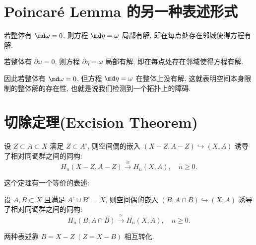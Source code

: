 \section[Poincar\'e Lemma]{Poincar\'e Lemma 的另一种表述形式}
    \begin{lemma}
        若整体有 $\md\omega = 0$, 
        则方程 $\md\eta=\omega$ 局部有解, 
        即在每点处存在邻域使得方程有解.
    \end{lemma}
    \begin{lemma}
        若整体有 $\overline{\partial}\omega = 0$, 
        则方程 $\overline{\partial}\eta=\omega$ 局部有解, 
        即在每点处存在邻域使得方程有解.
    \end{lemma}
    \begin{remark}
        因此若整体有 $\md\omega = 0$, 
        但方程 $\md\eta=\omega$ 在整体上没有解, 
        这就表明空间本身限制的整体解的存在性, 
        也就是说我们检测到一个拓扑上的障碍.
    \end{remark}

\section[Excision Theorem in Signular Homology]{切除定理(Excision Theorem)}
    \begin{theorem}[切除定理表述1]\label{thm:excision-1}
        设 $Z\subset A\subset X$ 满足 $\overline{Z}\subset A^{\circ}$, 
        则空间偶的嵌入 $(X-Z,A-Z)\hookrightarrow(X,A)$ 
        诱导了相对同调群之间的同构:
        \begin{equation*}
            H_n(X-Z,A-Z)\overset{\cong}{\longrightarrow} H_n(X,A),\quad n\geq0.
        \end{equation*}
    \end{theorem}
    这个定理有一个等价的表述:
    \begin{theorem}[切除定理表述2]\label{thm:excision-2}
        设 $A,B\subset X$ 且满足 $A^{\circ}\cup B^{\circ}=X$, 
        则空间偶的嵌入 $(B,A\cap B)\hookrightarrow(X,A)$ 
        诱导了相对同调群之间的同构:
        \begin{equation*}
            H_n(B,A\cap B)\overset{\cong}{\longrightarrow} 
            H_n(X,A),\quad n\geq0.
        \end{equation*}
    \end{theorem}
    \begin{remark}
        两种表述靠 $B=X-Z\;(Z=X-B)$ 相互转化.
    \end{remark}

